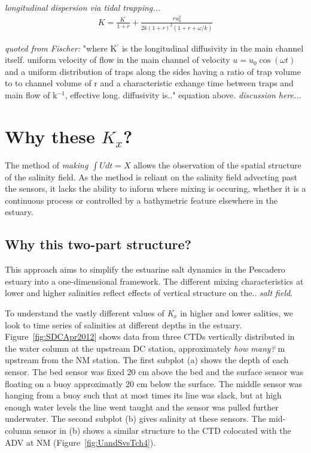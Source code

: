 \emph{longitudinal dispersion via tidal trapping...}
\begin{eqnarray}
K = \frac{K^{'}}{1+r} + \frac{ru_0^2}{2k(1+r)^2(1+r+\omega / k)} \label{eq:KxOkubo}
\end{eqnarray}

\emph{quoted from Fischer:} "where K$^{'}$ is the longitudinal diffusivity in the main channel itself. uniform velocity of flow in the main channel of velocity $u = u_0 \cos(\omega t)$ and a uniform distribution of traps along the sides having a ratio of trap volume to to channel volume of r and a characteristic exhange time between traps and main flow of k$^{-1}$, effective long. diffusivity is.." equation above. \emph{discussion here...}


\section{Why these $K_x$?}

The method of \emph{making $\int{U}dt = X$} allows the observation of the spatial structure of the salinity field.  As the method is reliant on the salinity field advecting past the sensors, it lacks the ability to inform where mixing is occuring, whether it is a continuous process or controlled by a bathymetric feature elsewhere in the estuary. 

\subsection{Why this two-part structure?}

This approach aims to simplify the estuarine salt dynamics in the Pescadero estuary into a one-dimensional framework. The different mixing characteristics at lower and higher salinities reflect effects of vertical structure on the.. \emph{salt field}. 

To understand the vastly different values of \emph{K$_x$} in higher and lower salities, we look to time series of salinities at different depths in the estuary. Figure~\ref{fig:SDCApr2012} shows data from three CTDs vertically distributed in the water column at the upstream DC station, approximately \emph{how many?} m upstream from the NM station. The first subplot (a) shows the depth of each sensor. The bed sensor was fixed 20 cm above the bed and the surface sensor was floating on a buoy approximatly 20 cm below the surface. The middle sensor was hanging from a buoy such that at most times its line was slack, but at high enough water levels the line went taught and the sensor was pulled further underwater. The second subplot (b) gives salinity at these sensors. The mid-column sensor in (b) shows a similar structure to the CTD colocated with the ADV at NM (Figure~\ref{fig:UandSvsTch4}).

